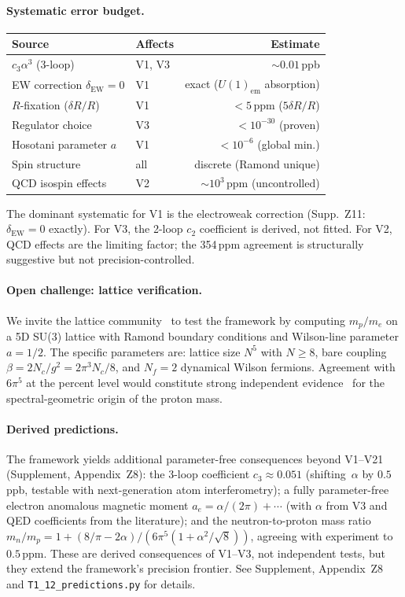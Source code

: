 \documentclass[11pt,a4paper]{article}
\theoremstyle{definition}
\theoremstyle{remark}
\begin{document}
\paragraph{Systematic error budget.}
\begin{center}
\renewcommand{\arraystretch}{1.15}\small
\begin{tabular}{llr}
\toprule
\textbf{Source} & \textbf{Affects} & \textbf{Estimate}\\
\midrule
$c_3\alpha^3$ (3-loop) & V1, V3 & $\sim 0.01\,$ppb\\
EW correction $\delta_{\mathrm{EW}}=0$ & V1 & exact ($U(1)_{\mathrm{em}}$ absorption)\\
$R$-fixation ($\delta R/R$) & V1 & $<5\,$ppm ($5\delta R/R$)\\
Regulator choice & V3 & $<10^{-30}$ (proven)\\
Hosotani parameter $a$ & V1 & $<10^{-6}$ (global min.)\\
Spin structure & all & discrete (Ramond unique)\\
QCD isospin effects & V2 & $\sim 10^3\,$ppm (uncontrolled)\\
\bottomrule
\end{tabular}
\end{center}
\noindent
The dominant systematic for V1 is the electroweak correction
(Supp.~Z11: $\delta_{\mathrm{EW}}=0$ exactly).  For V3, the 2-loop $c_2$
coefficient is derived, not fitted.  For V2, QCD effects are the
limiting factor; the 354\,ppm agreement is structurally suggestive
but not precision-controlled.

\paragraph{Open challenge: lattice verification.}
We invite the lattice community~\cite{Cossu2014,Durr2008} to test the framework by computing
$m_p/m_e$ on a 5D SU(3) lattice with Ramond boundary conditions and
Wilson-line parameter $a=1/2$.  The specific parameters are:
lattice size $N^5$ with $N\geq 8$, bare coupling
$\beta=2N_c/g^2=2\pi^3N_c/8$, and $N_f=2$ dynamical Wilson fermions.
Agreement with $6\pi^5$ at the percent level would constitute
strong independent evidence~\cite{Durr2008,Yang2018} for the spectral-geometric origin of the
proton mass.

\paragraph{Derived predictions.}
The framework yields additional parameter-free consequences beyond
V1--V21 (Supplement, Appendix~Z8): the 3-loop coefficient
$c_3\approx 0.051$ (shifting~$\alpha$ by $0.5\,$ppb, testable with
next-generation atom interferometry); a fully parameter-free
electron anomalous magnetic moment $a_e=\alpha/(2\pi)+\cdots$
(with $\alpha$ from V3 and QED coefficients from the literature);
and the neutron-to-proton mass ratio
$m_n/m_p=1+(8/\pi-2\alpha)/(6\pi^5(1+\alpha^2/\!\sqrt{8}))$,
agreeing with experiment to $0.5\,$ppm. These are derived
consequences of V1--V3, not independent tests, but they extend the
framework's precision frontier. See Supplement, Appendix~Z8 and
\texttt{T1\_12\_predictions.py} for details.
\end{document}

